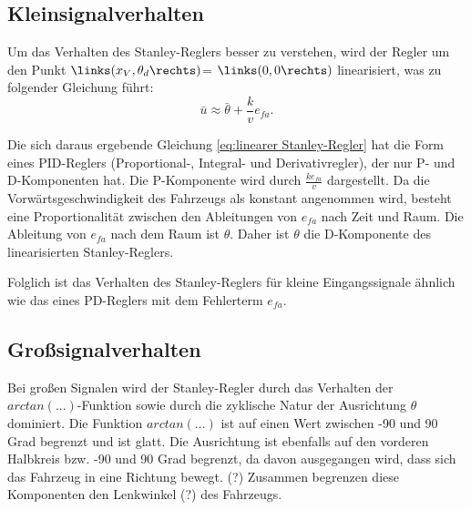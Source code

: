 \documentclass[arbeit=studie,oneside,BCOR=12mm]{ArbeitRST}
\begin{document}
\subsection{Kleinsignalverhalten}


Um das Verhalten des Stanley-Reglers besser zu verstehen, wird der Regler um
den Punkt \(\links(x_V, \theta_d\rechts)\)= \(\links(0, 0\rechts)\)
linearisiert, was zu folgender Gleichung führt: 
\begin{equation} \bar{u}
    \approx \bar{\theta} + \frac{k}{v}e_{fa}. 
    \label{eq:linearer Stanley-Regler}
\end{equation}

Die sich daraus ergebende Gleichung \eqref{eq:linearer Stanley-Regler} hat die
Form eines PID-Reglers (Proportional-, Integral- und Derivativregler), der nur
P- und D-Komponenten hat. Die P-Komponente wird durch \(\frac{ke_{fa}}{v}\)
dargestellt. Da die Vorwärtsgeschwindigkeit des Fahrzeugs als konstant
angenommen wird, besteht eine Proportionalität zwischen den Ableitungen von
\(e_{fa}\) nach Zeit und Raum. Die Ableitung von \(e_{fa}\) nach dem Raum ist
\(\theta\). Daher ist \(\theta\) die D-Komponente des linearisierten
Stanley-Reglers.

Folglich ist das Verhalten des Stanley-Reglers für kleine Eingangssignale
ähnlich wie das eines PD-Reglers mit dem Fehlerterm \(e_{fa}\). 


\subsection{Gro{\ss}signalverhalten}

Bei großen Signalen wird der Stanley-Regler durch das Verhalten der
\(arctan(...)\)-Funktion sowie durch die zyklische Natur der Ausrichtung
\(\theta\) dominiert. Die Funktion \(arctan(...)\) ist auf einen Wert zwischen
-90 und 90 Grad begrenzt und ist glatt. Die Ausrichtung ist ebenfalls auf den
vorderen Halbkreis bzw. -90 und 90 Grad begrenzt, da davon ausgegangen wird,
dass sich das Fahrzeug in eine Richtung bewegt. (?) Zusammen begrenzen diese
Komponenten den Lenkwinkel (?) des Fahrzeugs.


\end{document}

